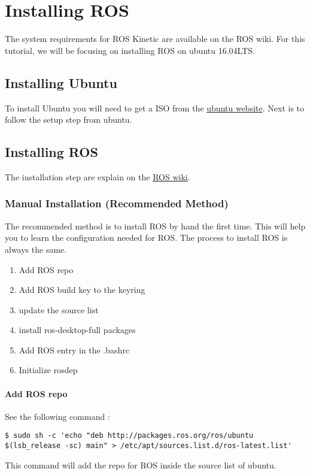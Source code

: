 \chapter{Installing ROS}
The system requirements for ROS Kinetic are available on the ROS wiki. For this tutorial, we will be focusing on installing ROS on ubuntu 16.04LTS.

\newpage

\section{Installing Ubuntu}
To install Ubuntu you will need to get a ISO from the \href{www.ubuntu.com}{ubuntu website}. Next is to follow the setup step from ubuntu.

\newpage

\section {Installing ROS}
The installation step are explain on the \href{wiki.ros.org/kinetic/Installation/Ubuntu}{ROS wiki}.

\subsection{Manual Installation (Recommended Method)}
The recommended method is to install ROS by hand the first time. This will help you to learn the configuration needed for ROS. The process to install ROS is always the same.

\begin{enumerate}
	\item Add ROS repo
	\item Add ROS build key to the keyring
	\item update the source list
	\item install ros-desktop-full packages
	\item Add ROS entry in the .bashrc
	\item Initialize rosdep
\end{enumerate}

\subsubsection{Add ROS repo}
\noindent See the following command :
\begin{lstlisting}[breaklines=True language=bash]
$ sudo sh -c 'echo "deb http://packages.ros.org/ros/ubuntu $(lsb_release -sc) main" > /etc/apt/sources.list.d/ros-latest.list'
\end{lstlisting}
\noindent This command will add the repo for ROS inside the source list of ubuntu.

